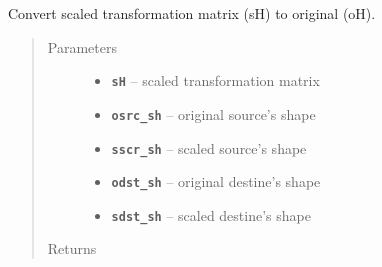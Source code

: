 \documentclass[letterpaper,10pt,english]{sphinxmanual}
\begin{document}

\begin{fulllineitems}
\label{RRtoolbox.lib.arrayops:RRtoolbox.lib.arrayops.convert.sh2oh}
Convert scaled transformation matrix (sH) to original (oH).
\begin{quote}\begin{description}
\item[{Parameters}] \leavevmode\begin{itemize}
\item {} 
\textbf{\texttt{sH}} -- scaled transformation matrix

\item {} 
\textbf{\texttt{osrc\_sh}} -- original source's shape

\item {} 
\textbf{\texttt{sscr\_sh}} -- scaled source's shape

\item {} 
\textbf{\texttt{odst\_sh}} -- original destine's shape

\item {} 
\textbf{\texttt{sdst\_sh}} -- scaled destine's shape

\end{itemize}

\item[{Returns}] \leavevmode


\end{description}\end{quote}

\end{fulllineitems}

\end{document}
